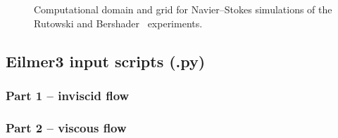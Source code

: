 \begin{figure}
\centering
 \caption{Computational domain and grid for Navier--Stokes simulations of the Rutowski and Bershader~\cite{RB64} experiments.}
  \label{fig:domain}
\end{figure}




\subsection{Eilmer3 input scripts (.py)}

\subsubsection{Part 1 -- inviscid flow}

\topbar

\bottombar

\subsubsection{Part 2 -- viscous flow}

